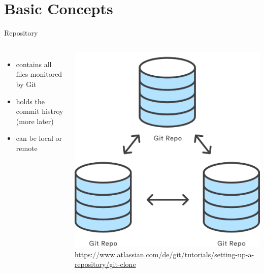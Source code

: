 \documentclass[10pt, graphics, aspectratio=169, table]{beamer}
\begin{document}
    \section{Basic Concepts}
    \begin{frame}{Repository}
        \begin{columns}
                \begin{itemize}
                    \item contains all files monitored by Git
                    \item holds the commit histroy (more later)
                    \item can be local or remote
                \end{itemize}
                \center\includegraphics[scale=0.4]{img/repo.png}
                \center\tiny\url{https://www.atlassian.com/de/git/tutorials/setting-up-a-repository/git-clone}
        \end{columns}
    \end{frame}
\end{document}
